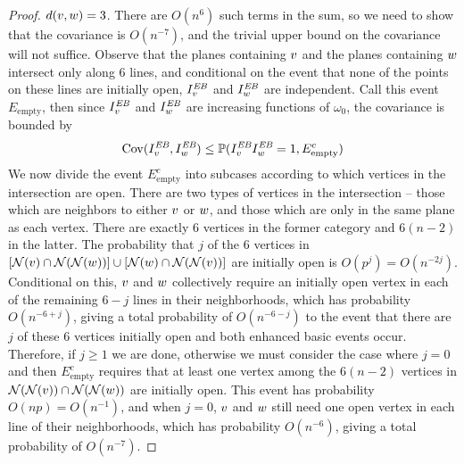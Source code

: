 \begin{proof}
 $d({ v},{ w})=3$.  There are $O(n^{6})$ such terms in the sum, so we need to show that the covariance is $O(n^{-7})$, and the trivial upper bound on the covariance will not suffice.  Observe that the planes containing ${ v}$ and the planes containing ${ w}$ intersect only along 6 lines, and conditional on the event that none of the points on these lines are initially open, $I^{\text{\em EB}}_{{ v}}$ and $I^{\text{\em EB}}_{{ w}}$ are independent.  Call this event $E_{\text{empty}}$, then since $I^{\text{\em EB}}_{{ v}}$ and $I^{\text{\em EB}}_{{ w}}$ are increasing functions of $\omega_0$, the covariance is bounded by
\begin{align*}
\operatorname{Cov}(I^{\text{\em EB}}_{{ v}},I^{\text{\em EB}}_{{ w}}) \leq \mathbb{P}{(I^{\text{\em EB}}_{{ v}}I^{\text{\em EB}}_{{ w}} = 1, E_{\text{empty}}^c)}
\end{align*}
We now divide the event $E_{\text{empty}}^c$ into subcases according to which vertices in the intersection are open.  There are two types of vertices in the intersection -- those which are neighbors to either ${ v}$ or ${ w}$, and those which are only in the same plane as each vertex.  There are exactly 6 vertices in the former category and $6(n-2)$ in the latter.  The probability that $j$ of the 6 vertices in $[\mathcal{N}({ v})\cap\mathcal{N}(\mathcal{N}({ w}))] \cup [\mathcal{N}({ w})\cap\mathcal{N}(\mathcal{N}({ v}))]$ are initially open is $O(p^j) = O(n^{-2j})$.  Conditional on this, ${ v}$ and ${ w}$ collectively require an initially open vertex in each of the remaining $6-j$ lines in their neighborhoods, which has probability $O(n^{-6+j})$, giving a total probability of $O(n^{-6-j})$ to the event that there are $j$ of these 6 vertices initially open and both enhanced basic events occur.  Therefore, if $j\geq 1$ we are done, otherwise we must consider the case where $j=0$ and then $E_{\text{empty}}^c$
requires that at least one vertex among the $6(n-2)$ vertices in $\mathcal{N}(\mathcal{N}({ v}))\cap\mathcal{N}(\mathcal{N}({ w}))$ are initially open.  This event has probability $O(np) = O(n^{-1})$, and when $j=0$, ${ v}$ and ${ w}$ still need one open vertex in each line of their neighborhoods, which has probability $O(n^{-6})$, giving a total probability of $O(n^{-7})$.
\end{proof}

